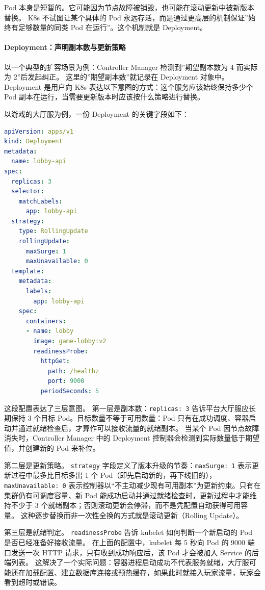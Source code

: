 Pod 本身是短暂的。它可能因为节点故障被销毁，也可能在滚动更新中被新版本替换。
K8s 不试图让某个具体的 Pod 永远存活，而是通过更高层的机制保证”始终有足够数量的同类 Pod 在运行”。这个机制就是 Deployment。

\paragraph{Deployment：声明副本数与更新策略}

以一个典型的扩容场景为例：Controller Manager 检测到”期望副本数为 4 而实际为 2”后发起纠正。
这里的”期望副本数”就记录在 Deployment 对象中。
Deployment 是用户向 K8s 表达以下意图的方式：这个服务应该始终保持多少个 Pod 副本在运行，当需要更新版本时应该按什么策略进行替换。

以游戏的大厅服为例，一份 Deployment 的关键字段如下：

\begin{tcolorbox}[title=大厅服 Deployment 配置示例]
\begin{lstlisting}[style=codeblock, language=yaml]
apiVersion: apps/v1
kind: Deployment
metadata:
  name: lobby-api
spec:
  replicas: 3
  selector:
    matchLabels:
      app: lobby-api
  strategy:
    type: RollingUpdate
    rollingUpdate:
      maxSurge: 1
      maxUnavailable: 0
  template:
    metadata:
      labels:
        app: lobby-api
    spec:
      containers:
      - name: lobby
        image: game-lobby:v2
        readinessProbe:
          httpGet:
            path: /healthz
            port: 9000
          periodSeconds: 5
\end{lstlisting}
\end{tcolorbox}

这段配置表达了三层意图。
第一层是副本数：\texttt{replicas: 3} 告诉平台大厅服应长期保持 3 个目标 Pod。目标数量不等于可用数量：Pod 只有在成功调度、容器启动并通过就绪检查后，才算作可以接收流量的就绪副本。
当某个 Pod 因节点故障消失时，Controller Manager 中的 Deployment 控制器会检测到实际数量低于期望值，并创建新的 Pod 来补位。

第二层是更新策略。
\texttt{strategy} 字段定义了版本升级的节奏：\texttt{maxSurge: 1} 表示更新过程中最多比目标多出 1 个 Pod（即先启动新的，再下线旧的），\texttt{maxUnavailable: 0} 表示控制器以“不主动减少现有可用副本”为更新约束。只有在集群仍有可调度容量、新 Pod 能成功启动并通过就绪检查时，更新过程中才能维持不少于 3 个就绪副本；否则滚动更新会停滞，而不是凭配置自动获得可用容量。
这种逐步替换而非一次性全换的方式就是滚动更新（Rolling Update）。

第三层是就绪判定。
\texttt{readinessProbe} 告诉 kubelet 如何判断一个新启动的 Pod 是否已经准备好接收流量。
在上面的配置中，kubelet 每 5 秒向 Pod 的 9000 端口发送一次 HTTP 请求，只有收到成功响应后，该 Pod 才会被加入 Service 的后端列表。
这解决了一个实际问题：容器进程启动成功不代表服务就绪，大厅服可能还在加载配置、建立数据库连接或预热缓存，如果此时就接入玩家流量，玩家会看到超时或错误。

